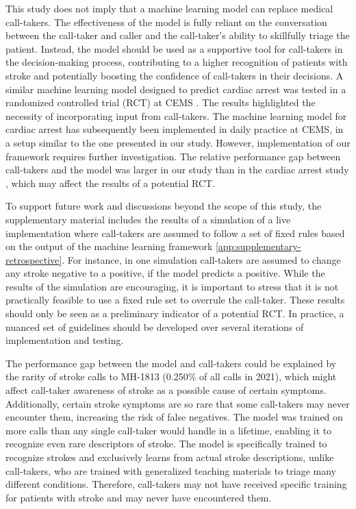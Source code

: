 {This study does not imply that a machine learning model can replace medical call-takers. The effectiveness of the model is fully reliant on the conversation between the call-taker and caller and the call-taker's ability to skillfully triage the patient. Instead, the model should be used as a supportive tool for call-takers in the decision-making process, contributing to a higher recognition of patients with stroke and potentially boosting the confidence of call-takers in their decisions. A similar machine learning model designed to predict cardiac arrest was tested in a randomized controlled trial (RCT) at CEMS \parencite{cite15}. The results highlighted the necessity of incorporating input from call-takers. The machine learning model for cardiac arrest has subsequently been implemented in daily practice at CEMS, in a setup similar to the one presented in our study. However, implementation of our framework requires further investigation. The relative performance gap between call-takers and the model was larger in our study than in the cardiac arrest study \parencite{cite15}, which may affect the results of a potential RCT. 

To support future work and discussions beyond the scope of this study, the supplementary material includes the results of a simulation of a live implementation where call-takers are assumed to follow a set of fixed rules based on the output of the machine learning framework \cref{app:supplementary-retrospective}. For instance, in one simulation call-takers are assumed to change any stroke negative to a positive, if the model predicts a positive. While the results of the simulation are encouraging, it is important to stress that it is not practically feasible to use a fixed rule set to overrule the call-taker. These results should only be seen as a preliminary indicator of a potential RCT. In practice, a nuanced set of guidelines should be developed over several iterations of implementation and testing.

The performance gap between the model and call-takers could be explained by the rarity of stroke calls to MH-1813 (0.250\% of all calls in 2021), which might affect call-taker awareness of stroke as a possible cause of certain symptoms. Additionally, certain stroke symptoms are so rare that some call-takers may never encounter them, increasing the risk of false negatives. The model was trained on more calls than any single call-taker would handle in a lifetime, enabling it to recognize even rare descriptors of stroke. The model is specifically trained to recognize strokes and exclusively learns from actual stroke descriptions, unlike call-takers, who are trained with generalized teaching materials to triage many different conditions. Therefore, call-takers may not have received specific training for patients with stroke and may never have encountered them. 

}
